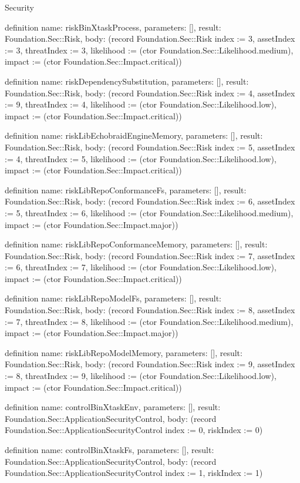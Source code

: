 \begin{lexlean}{Security}
\begin{semanticmodule}
definition{
  name: riskBinXtaskProcess,
  parameters: [],
  result: Foundation.Sec::Risk,
  body: (record Foundation.Sec::Risk {index := 3, assetIndex := 3, threatIndex := 3, likelihood := (ctor Foundation.Sec::Likelihood.medium), impact := (ctor Foundation.Sec::Impact.critical)})
}

definition{
  name: riskDependencySubstitution,
  parameters: [],
  result: Foundation.Sec::Risk,
  body: (record Foundation.Sec::Risk {index := 4, assetIndex := 9, threatIndex := 4, likelihood := (ctor Foundation.Sec::Likelihood.low), impact := (ctor Foundation.Sec::Impact.critical)})
}

definition{
  name: riskLibEchobraidEngineMemory,
  parameters: [],
  result: Foundation.Sec::Risk,
  body: (record Foundation.Sec::Risk {index := 5, assetIndex := 4, threatIndex := 5, likelihood := (ctor Foundation.Sec::Likelihood.low), impact := (ctor Foundation.Sec::Impact.critical)})
}

definition{
  name: riskLibRepoConformanceFs,
  parameters: [],
  result: Foundation.Sec::Risk,
  body: (record Foundation.Sec::Risk {index := 6, assetIndex := 5, threatIndex := 6, likelihood := (ctor Foundation.Sec::Likelihood.medium), impact := (ctor Foundation.Sec::Impact.major)})
}

definition{
  name: riskLibRepoConformanceMemory,
  parameters: [],
  result: Foundation.Sec::Risk,
  body: (record Foundation.Sec::Risk {index := 7, assetIndex := 6, threatIndex := 7, likelihood := (ctor Foundation.Sec::Likelihood.low), impact := (ctor Foundation.Sec::Impact.critical)})
}

definition{
  name: riskLibRepoModelFs,
  parameters: [],
  result: Foundation.Sec::Risk,
  body: (record Foundation.Sec::Risk {index := 8, assetIndex := 7, threatIndex := 8, likelihood := (ctor Foundation.Sec::Likelihood.medium), impact := (ctor Foundation.Sec::Impact.major)})
}

definition{
  name: riskLibRepoModelMemory,
  parameters: [],
  result: Foundation.Sec::Risk,
  body: (record Foundation.Sec::Risk {index := 9, assetIndex := 8, threatIndex := 9, likelihood := (ctor Foundation.Sec::Likelihood.low), impact := (ctor Foundation.Sec::Impact.critical)})
}

definition{
  name: controlBinXtaskEnv,
  parameters: [],
  result: Foundation.Sec::ApplicationSecurityControl,
  body: (record Foundation.Sec::ApplicationSecurityControl {index := 0, riskIndex := 0})
}

definition{
  name: controlBinXtaskFs,
  parameters: [],
  result: Foundation.Sec::ApplicationSecurityControl,
  body: (record Foundation.Sec::ApplicationSecurityControl {index := 1, riskIndex := 1})
}


\end{semanticmodule}
\end{lexlean}
